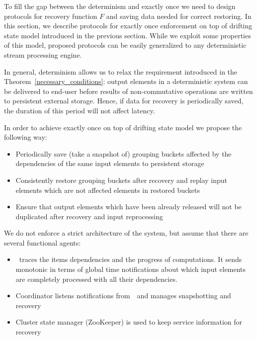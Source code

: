 
\label {fs-consistency-section}

To fill the gap between the determinism and exactly once we need to design protocols for recovery function $F$ and saving data needed for correct restoring. In this section, we describe protocols for exactly once enforcement on top of drifting state model introduced in the previous section. While we exploit some properties of this model, proposed protocols can be easily generalized to any deterministic stream processing engine.

In general, determinism allows us to relax the requirement introduced in the Theorem~\ref{necessary_conditions}: output elements in a deterministic system can be delivered to end-user before results of non-commutative operations are written to persistent external storage. Hence, if data for recovery is periodically saved, the duration of this period will not affect latency.

In order to achieve exactly once on top of drifting state model we propose the following way:
\begin{itemize}
    \item Periodically save (take a snapshot of) grouping buckets affected by the dependencies of the same input elements to persistent storage
    \item Consistently restore grouping buckets after recovery and replay input elements which are not affected elements in restored buckets
    \item Ensure that output elements which have been already released will not be duplicated after recovery and input reprocessing
\end{itemize}

We do not enforce a strict architecture of the system, but assume that there are several functional agents:
\begin{itemize}
    \item \Acker\ traces the items dependencies and the progress of computations. It sends monotonic in terms of global time notifications about which input elements are completely processed with all their dependencies.
    \item Coordinator listens notifications from~\Acker\ and manages snapshotting and recovery
    \item Cluster state manager (ZooKeeper) is used to keep service information for recovery
\end{itemize}

